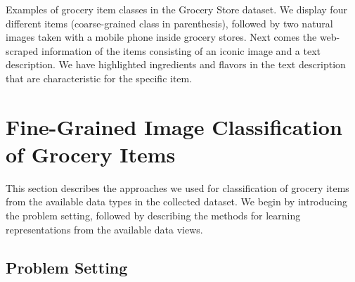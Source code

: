 
\begin{table}[t]
	\centering
	\caption{\small{ Examples of grocery item classes in the Grocery Store dataset. We display four different items (coarse-grained class in parenthesis), followed by two natural images taken with a mobile phone inside grocery stores. Next comes the web-scraped information of the items consisting of an iconic image and a text description. We have highlighted ingredients and flavors in the text description that are characteristic for the specific item. }}
	\vspace{-10pt}
	\setlength{\fboxsep}{0pt} 
	\setlength{\fboxrule}{0.33pt}
	
	\label{tab:grocery_store_dataset}
\end{table}

\section{Fine-Grained Image Classification of Grocery Items}\label{chap3:sec:fgr_of_grocery_items}

This section describes the approaches we used for classification of grocery items from the available data types in the collected dataset. We begin by introducing the problem setting, followed by describing the methods for learning representations from the available data views. 

\subsection{Problem Setting}

